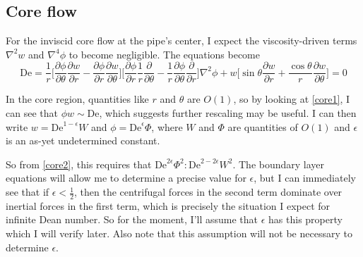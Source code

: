 \documentclass[10pt,a4paper]{report}
\begin{document}
\subsection{Core flow}

For the inviscid core flow at the pipe's center, I expect the viscosity-driven terms $\nabla^2 w$ and $\nabla^4 \phi$ to become negligible. The equations become
\begin{subequations}
\begin{equation}\label{core1}
\textrm{De} = \frac{1}{r} \bigg[\frac{\partial \phi}{\partial \theta} \frac{\partial w}{\partial r} - \frac{\partial \phi}{\partial r} \frac{\partial w}{\partial \theta}\bigg]
\end{equation}
\begin{equation}\label{core2}
\bigg[\frac{\partial \phi}{\partial r} \frac{1}{r} \frac{\partial}{\partial \theta} - \frac{1}{r} \frac{\partial \phi}{\partial \theta} \frac{\partial}{\partial r} \bigg] \nabla^2 \phi + w \bigg[ \sin \theta \frac{\partial w}{\partial r} + \frac{\cos \theta}{r} \frac{\partial w}{\partial \theta} \bigg] = 0
\end{equation}
\end{subequations}

In the core region, quantities like $r$ and $\theta$ are $O(1)$, so by looking at \eqref{core1}, I can see that $\phi w \sim \textrm{De}$, which suggests further rescaling may be useful. I can then write $w = \textrm{De}^{1-\epsilon} W$ and $\phi = \textrm{De}^\epsilon \Phi$, where $W$ and $\Phi$ are quantities of $O(1)$ and $\epsilon$ is an as-yet undetermined constant.

So from \eqref{core2}, this requires that $\textrm{De}^{2 \epsilon} \Phi^2 : \textrm{De}^{2 - 2 \epsilon} W^2$. The boundary layer equations will allow me to determine a precise value for $\epsilon$, but I can immediately see that if $\epsilon < \frac{1}{2}$, then the centrifugal forces in the second term dominate over inertial forces in the first term, which is precisely the situation I expect for infinite Dean number. So for the moment, I'll assume that $\epsilon$ has this property which I will verify later. Also note that this assumption will not be necessary to determine $\epsilon$.
\end{document}
